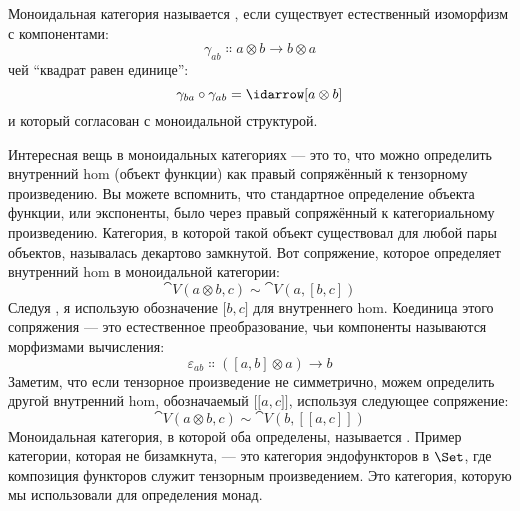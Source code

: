 \begin{figure}[H]
  \centering
\end{figure}

\begin{figure}[H]
  \centering
\end{figure}

\noindent
Моноидальная категория называется , если существует естественный
изоморфизм с компонентами:
\[\gamma_{a b} \Colon a \otimes b \to b \otimes a\]
чей ``квадрат равен единице'':
\[\gamma_{b a} \circ \gamma_{a b} = \idarrow[a \otimes b]\]
и который согласован с моноидальной структурой.

Интересная вещь в моноидальных категориях — это то, что можно
определить внутренний hom (объект функции) как правый сопряжённый к
тензорному произведению. Вы можете вспомнить, что стандартное определение
объекта функции, или экспоненты, было через правый сопряжённый к
категориальному произведению. Категория, в которой такой объект существовал для
любой пары объектов, называлась декартово замкнутой. Вот сопряжение,
которое определяет внутренний hom в моноидальной категории:
\[\cat{V}(a \otimes b, c) \sim \cat{V}(a, [b, c])\]
Следуя
, я использую обозначение ${[}b, c{]}$ для внутреннего
hom. Коединица этого сопряжения — это естественное преобразование, чьи
компоненты называются морфизмами вычисления:
\[\varepsilon_{a b} \Colon ([a, b] \otimes a) \to b\]
Заметим, что если тензорное произведение не симметрично, можем определить
другой внутренний hom, обозначаемый ${[}{[}a, c{]}{]}$, используя
следующее сопряжение:
\[\cat{V}(a \otimes b, c) \sim \cat{V}(b, [[a, c]])\]
Моноидальная категория, в которой оба определены, называется . Пример
категории, которая не бизамкнута, — это категория
эндофункторов в $\Set$, где композиция функторов служит тензорным
произведением. Это категория, которую мы использовали для определения монад.

